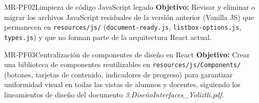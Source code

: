 \begin{RequisitoFuncional}{MR-PF02}{Limpieza de código JavaScript legado}
    \textbf{Objetivo:} Revisar y eliminar o migrar los archivos JavaScript residuales
    de la versión anterior (Vanilla JS) que permanecen en \texttt{resources/js/}
    (\texttt{document-ready.js}, \texttt{listbox-options.js}, \texttt{types.js}) y
    que no forman parte de la arquitectura React actual.
\end{RequisitoFuncional}

\begin{RequisitoFuncional}{MR-PF03}{Centralización de componentes de diseño en React}
    \textbf{Objetivo:} Crear una biblioteca de componentes reutilizables en
    \texttt{resources/js/Components/} (botones, tarjetas de contenido, indicadores
    de progreso) para garantizar uniformidad visual en todas las vistas de alumnos
    y docentes, siguiendo los lineamientos de diseño del documento
    \textit{3.DiseñoInterfaces\_Yoliztli.pdf}.
\end{RequisitoFuncional}
